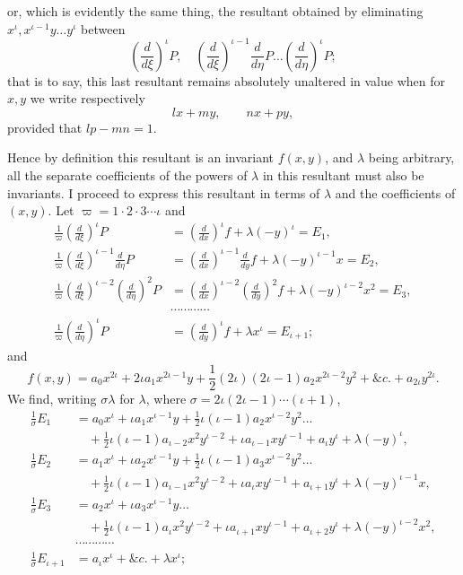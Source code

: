 \documentclass[11pt]{article}
\newcommand{\sourcepage}[1]{\marginpar{\scriptsize p.~#1}}
\begin{document}
{{\sourcepage{276}
or, which is evidently the same thing, the resultant obtained by eliminating $x^\iota,x^{\iota-1}y\ldots y^\iota$ between
\[
\left(\frac{d}{d\xi}\right)^\iota P,\quad
\left(\frac{d}{d\xi}\right)^{\iota-1}\frac{d}{d\eta}P\ldots
\left(\frac{d}{d\eta}\right)^\iota P;
\]
that is to say, this last resultant remains absolutely unaltered in value when for $x,y$ we write respectively
\[
lx+my,\qquad nx+py,
\]
provided that $lp-mn=1$.

Hence by definition this resultant is an invariant $f(x,y)$, and $\lambda$ being arbitrary, all the separate coefficients of the powers of $\lambda$ in this resultant must also be invariants. I proceed to express this resultant in terms of $\lambda$ and the coefficients of $(x,y)$. Let $\varpi=1\cdot2\cdot3\cdots\iota$ and
\[
\begin{aligned}
\frac1\varpi\left(\frac{d}{d\xi}\right)^\iota P
&=\left(\frac{d}{dx}\right)^\iota f+\lambda(-y)^\iota=E_1,\\
\frac1\varpi\left(\frac{d}{d\xi}\right)^{\iota-1}\frac{d}{d\eta}P
&=\left(\frac{d}{dx}\right)^{\iota-1}\frac{d}{dy}f+\lambda(-y)^{\iota-1}x=E_2,\\
\frac1\varpi\left(\frac{d}{d\xi}\right)^{\iota-2}\left(\frac{d}{d\eta}\right)^2P
&=\left(\frac{d}{dx}\right)^{\iota-2}\left(\frac{d}{dy}\right)^2f+\lambda(-y)^{\iota-2}x^2=E_3,\\
&\cdots\cdots\cdots\cdots\\
\frac1\varpi\left(\frac{d}{d\eta}\right)^\iota P
&=\left(\frac{d}{dy}\right)^\iota f+\lambda x^\iota=E_{\iota+1};
\end{aligned}
\]
and
\[
f(x,y)=a_0x^{2\iota}+2\iota a_1x^{2\iota-1}y+\frac12(2\iota)(2\iota-1)a_2x^{2\iota-2}y^2+\&c.+a_{2\iota}y^{2\iota}.
\]
We find, writing $\sigma\lambda$ for $\lambda$, where $\sigma=2\iota(2\iota-1)\cdots(\iota+1)$,
\[
\begin{aligned}
\frac1\sigma E_1&=a_0x^\iota+\iota a_1x^{\iota-1}y+\frac12\iota(\iota-1)a_2x^{\iota-2}y^2\ldots\\
&\quad+\frac12\iota(\iota-1)a_{\iota-2}x^2y^{\iota-2}+\iota a_{\iota-1}xy^{\iota-1}+a_\iota y^\iota+\lambda(-y)^\iota,\\
\frac1\sigma E_2&=a_1x^\iota+\iota a_2x^{\iota-1}y+\frac12\iota(\iota-1)a_3x^{\iota-2}y^2\ldots\\
&\quad+\frac12\iota(\iota-1)a_{\iota-1}x^2y^{\iota-2}+\iota a_\iota xy^{\iota-1}+a_{\iota+1}y^\iota+\lambda(-y)^{\iota-1}x,\\
\frac1\sigma E_3&=a_2x^\iota+\iota a_3x^{\iota-1}y\ldots\\
&\quad+\frac12\iota(\iota-1)a_\iota x^2y^{\iota-2}+\iota a_{\iota+1}xy^{\iota-1}+a_{\iota+2}y^\iota+\lambda(-y)^{\iota-2}x^2,\\
&\cdots\cdots\cdots\cdots\\
\frac1\sigma E_{\iota+1}&=a_\iota x^\iota+\&c.+\lambda x^\iota;
\end{aligned}
\]

}}
\end{document}
